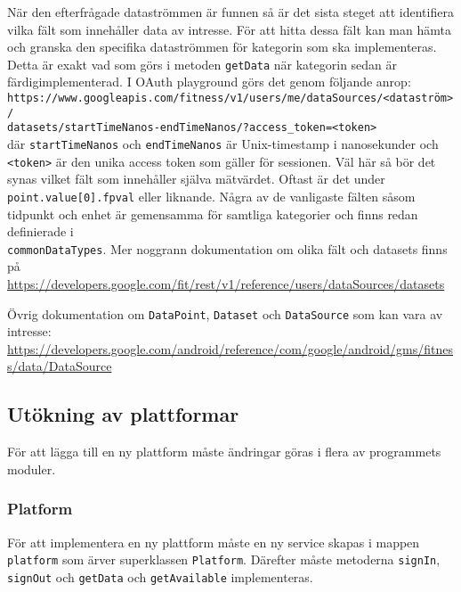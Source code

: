 \documentclass[techdoc/techdoc.tex]{subfiles}
\begin{document}
När den efterfrågade dataströmmen är funnen så är det sista steget att
identifiera vilka fält som innehåller data av intresse. För att hitta dessa
fält kan man hämta och granska den specifika dataströmmen för kategorin som ska
implementeras. Detta är exakt vad som görs i metoden \texttt{getData} när
kategorin sedan är färdigimplementerad. I OAuth playground görs det genom
följande anrop: \\
\texttt{https://www.googleapis.com/fitness/v1/users/me/dataSources/<dataström>/\\
datasets/startTimeNanos-endTimeNanos/?access\_token=<token>} \\ där
\texttt{startTimeNanos} och \texttt{endTimeNanos} är Unix-timestamp i
nanosekunder och \texttt{<token>} är den unika access token som gäller för
sessionen. Väl här så bör det synas vilket fält som innehåller själva
mätvärdet. Oftast är det under \texttt{point.value[0].fpval} eller liknande.
Några av de vanligaste fälten såsom tidpunkt och enhet är gemensamma för
samtliga kategorier och finns redan definierade i\\ \texttt{commonDataTypes}.
Mer noggrann dokumentation om olika fält och datasets finns på\\
\url{https://developers.google.com/fit/rest/v1/reference/users/dataSources/datasets}

Övrig dokumentation om \texttt{DataPoint}, \texttt{Dataset} och
\texttt{DataSource} som kan vara av intresse: \\
\url{https://developers.google.com/android/reference/com/google/android/gms/fitness/data/DataSource}


\subsection{Utökning av plattformar}
För att lägga till en ny plattform måste ändringar göras i flera av programmets
moduler.

\subsubsection{Platform}
För att implementera en ny plattform måste en ny service skapas i mappen
\texttt{platform} som ärver superklassen \texttt{Platform}. Därefter måste
metoderna \texttt{signIn}, \texttt{signOut} och \texttt{getData} och
\texttt{getAvailable} implementeras.
\end{document}
